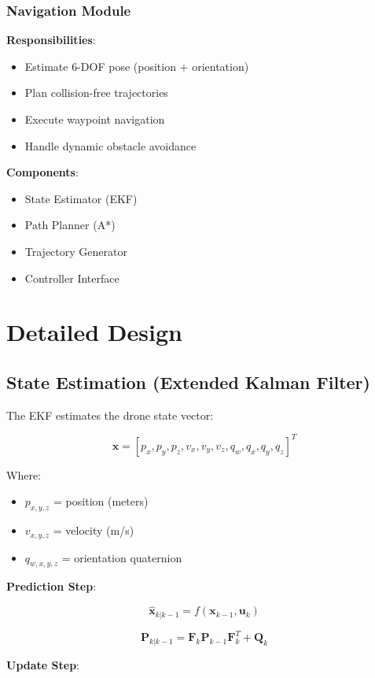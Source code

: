 \documentclass[11pt,a4paper]{article}
\begin{document}
\subsubsection{Navigation Module}

\textbf{Responsibilities}:
\begin{itemize}
    \item Estimate 6-DOF pose (position + orientation)
    \item Plan collision-free trajectories
    \item Execute waypoint navigation
    \item Handle dynamic obstacle avoidance
\end{itemize}

\textbf{Components}:
\begin{itemize}
    \item State Estimator (EKF)
    \item Path Planner (A*)
    \item Trajectory Generator
    \item Controller Interface
\end{itemize}

\section{Detailed Design}

\subsection{State Estimation (Extended Kalman Filter)}

The EKF estimates the drone state vector:

\[
\mathbf{x} = [p_x, p_y, p_z, v_x, v_y, v_z, q_w, q_x, q_y, q_z]^T
\]

Where:
\begin{itemize}
    \item $p_{x,y,z}$ = position (meters)
    \item $v_{x,y,z}$ = velocity (m/s)
    \item $q_{w,x,y,z}$ = orientation quaternion
\end{itemize}

\textbf{Prediction Step}:

\[
\hat{\mathbf{x}}_{k|k-1} = f(\mathbf{x}_{k-1}, \mathbf{u}_k)
\]

\[
\mathbf{P}_{k|k-1} = \mathbf{F}_k \mathbf{P}_{k-1} \mathbf{F}_k^T + \mathbf{Q}_k
\]

\textbf{Update Step}:
\end{document}
